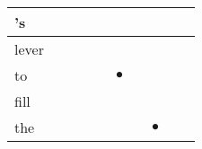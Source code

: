 \documentclass[landscape]{article}
\newcommand{\ssp}{\hspace{2pt}}
\newcommand{\mex}{\cellcolor{g}$\bullet$}
\begin{document}
\begin{tabular}{|l|p{10pt}|p{10pt}|p{10pt}|p{10pt}|p{10pt}|p{10pt}|p{10pt}|p{10pt}|p{10pt}|}
\hline
\ssp 's \ssp&\hspace{2pt}&\hspace{2pt}&\hspace{2pt}&\hspace{2pt}&\hspace{2pt}&\hspace{2pt}&\hspace{2pt}&\hspace{2pt}&\hspace{2pt}\\
\hline
\ssp lever \ssp&\hspace{2pt}&\hspace{2pt}&\hspace{2pt}&\hspace{2pt}&\hspace{2pt}&\hspace{2pt}&\hspace{2pt}&\hspace{2pt}&\hspace{2pt}\\
\hline
\ssp \cellcolor{ref4}to \ssp&\hspace{2pt}&\hspace{2pt}&\hspace{2pt}&\hspace{2pt}&\hspace{2pt}\mex&\hspace{2pt}&\hspace{2pt}&\hspace{2pt}&\hspace{2pt}\\
\hline
\ssp fill \ssp&\hspace{2pt}&\hspace{2pt}&\hspace{2pt}&\hspace{2pt}&\hspace{2pt}&\hspace{2pt}&\hspace{2pt}&\hspace{2pt}&\hspace{2pt}\\
\hline
\ssp \cellcolor{ref6}the \ssp&\hspace{2pt}&\hspace{2pt}&\hspace{2pt}&\hspace{2pt}&\hspace{2pt}&\hspace{2pt}&\hspace{2pt}\mex&\hspace{2pt}&\hspace{2pt}\\

\end{tabular}
\end{document}

